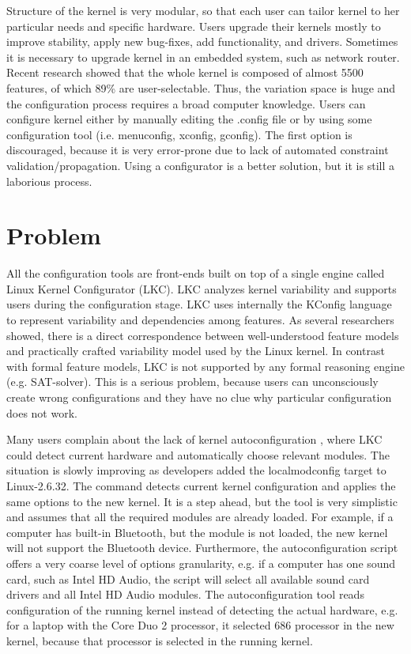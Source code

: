 \documentclass{chi2009}
\begin{document}

Structure of the kernel is very modular, so that each user can tailor kernel to her particular needs and specific hardware. Users upgrade their kernels mostly to improve stability, apply new bug-fixes, add functionality, and drivers. Sometimes it is necessary to upgrade kernel in an embedded system, such as network router. Recent research \cite{she:kernel:2010} showed that the whole kernel is composed of almost 5500 features, of which 89\% are user-selectable. Thus, the variation space is huge and the configuration process requires a broad computer knowledge. Users can configure kernel either by manually editing the \textsf{.config} file or by using some configuration tool (i.e. \textsf{menuconfig, xconfig, gconfig}). The first option is discouraged, because it is very error-prone due to lack of automated constraint validation/propagation. Using a configurator is a better solution, but it is still a laborious process.

\section{Problem}
All the configuration tools are front-ends built on top of a single engine called Linux Kernel Configurator (LKC). LKC analyzes kernel variability and supports users during the configuration stage. LKC uses internally the KConfig language to represent variability and dependencies among features. As several researchers \cite{sincero:lkc:2008,she:kernel:2010} showed, there is a direct correspondence between well-understood feature models and practically crafted variability model used by the Linux kernel. In contrast with formal feature models, LKC is not supported by any formal reasoning engine (e.g. SAT-solver). This is a serious problem, because users can unconsciously create wrong configurations and they have no clue why particular configuration does not work.

Many users complain about the lack of kernel autoconfiguration \cite{debian:config:2010,soft32:config:2007}, where LKC could detect current hardware and automatically choose relevant modules. The situation is slowly improving as developers added the \textsf{localmodconfig} target to Linux-2.6.32. The command detects current kernel configuration and applies the same options to the new kernel. It is a step ahead, but the tool is very simplistic and assumes that all the required modules are already loaded. For example, if a computer has built-in Bluetooth, but the module is not loaded, the new kernel will not support the Bluetooth device. Furthermore, the autoconfiguration script offers a very coarse level of options granularity, e.g. if a computer has one sound card, such as Intel HD Audio, the script will select all available sound card drivers and all Intel HD Audio modules. The autoconfiguration tool reads configuration of the running kernel instead of detecting the actual hardware, e.g. for a laptop with the Core Duo 2 processor, it selected 686 processor in the new kernel, because that processor is selected in the running kernel.
\end{document}
